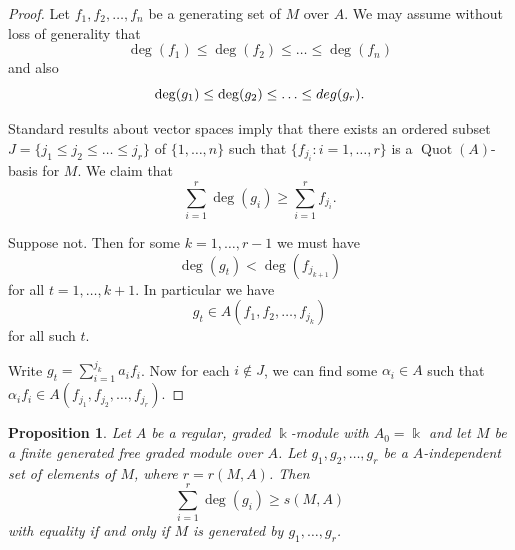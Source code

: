 \documentclass[a4paper]{amsart}
\newcommand{\kk}{\Bbbk}
\def\Quot{\operatorname{Quot}}
\newtheorem{prop}[Lemma]{Proposition}
\newtheorem*{Corollary of Conjecture}{Corollary of Conjecture}
\theoremstyle{definition}
\theoremstyle{remark}
\theoremstyle{Acknowledgments}
\begin{document}
\begin{proof} Let $f_1, f_2, \ldots, f_n$ be a generating set of $M$ over $A$. We may assume without loss of generality that 
\[\deg(f_1) \leq \deg(f_2) \leq \ldots \leq \deg(f_n)\] and also
\[\deg(g_1) \leq \deg(g_2) \leq \ldots \leq \\deg(g_r).\]

Standard results about vector spaces imply that there exists an ordered subset $J  = \{j_1 \leq j_2 \leq \ldots \leq  j_r\}$ of $\{1, \ldots, n\}$ such that $\{f_{j_i}: i = 1, \ldots, r\}$ is a $\Quot(A)$-basis for $M$. We claim that
\[\sum_{i=1}^r \deg(g_i) \geq \sum_{i=1}^r f_{j_i}.\]

Suppose not. Then for some $k=1, \ldots, r-1$ we must have
\[\deg(g_t) < \deg(f_{j_{k+1}})\] for all $t = 1, \ldots, k+1$. In particular we have
\[g_t \in A(f_1, f_2, \ldots, f_{j_k})\] for all such $t$. 

Write $g_t = \sum_{i=1}^{j_{k}} a_i f_i$. Now for each $i \not \in J$, we can find some $\alpha_i \in A$ such that $\alpha_i f_i \in A(f_{j_1},f_{j_2}, \ldots, f_{j_r} )$.

\end{proof}
\fi

\begin{prop}\label{freetest} Let $A$ be a regular, graded $\kk$-module with $A_0= \kk$ and let $M$ be a finite generated free graded module over $A$. Let $g_1, g_2, \ldots, g_r$ be a $A$-independent set of elements of $M$, where $r = r(M,A)$. Then
\[\sum_{i=1}^r \deg(g_i) \geq s(M,A)\] with equality if and only if $M$ is generated by $g_1, \ldots, g_r$.
\end{prop}
\end{document}
